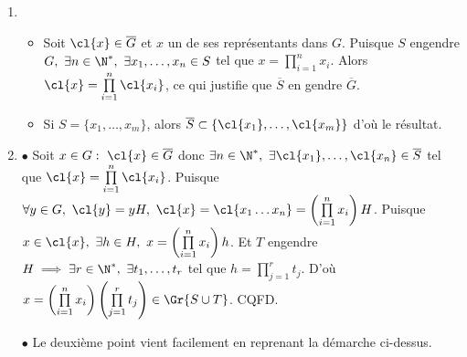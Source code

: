 \begin{enumerate}
 \item
 \begin{itemize}
  \item  Soit $\cl{x} \in \overline{G}$ et $x$ un de ses représentants dans $G$. Puisque $S$ engendre $G,~ \exists n\in \N^*,~\exists x_1,\ldots, x_n\in S$ tel que $x = \prod\limits_{i=1}^n x_i$. Alors $\cl{x} = \prod\limits_{i=1}^n \cl{x_i}$, ce qui justifie que $\overline{S}$ en gendre $\overline{G}$.
  \item Si $S =\{x_1,\ldots, x_m\}$, alors $\overline{S} \subset  \{\cl{x_1},\ldots, \cl{x_m}\}$ d'où le résultat.
 \end{itemize}

  \item $\bullet$ Soit $x\in G:~ \cl{x} \in \overline{G}$ donc $\exists n\in \N^*,~\exists \cl{x_1},\ldots, \cl{x_n}\in \overline{S}$ tel que $\cl{x} = \prod\limits_{i=1}^n \cl{x_i}$. Puisque $\forall y\in G,~ \cl{y} = yH,~ \cl{x} = \cl{x_1\ldots x_n} = \left(\prod\limits_{i=1}^nx_i\right)H$. Puisque $x\in \cl{x},~ \exists h\in H,~ x = \left(\prod\limits_{i=1}^n x_i\right)h$. Et $T$ engendre $H\implies \exists r\in\N^*,~ \exists t_1,\ldots, t_r$ tel que $h = \prod\limits_{j=1}^r t_j$. D'où $x = \left(\prod\limits_{i=1}^n x_i\right)\left(\prod\limits_{j=1}^r t_j \right) \in \Gr{S\cup T}$. CQFD.

 $\bullet$ Le deuxième point vient facilement en reprenant la démarche ci-dessus.
\end{enumerate}


